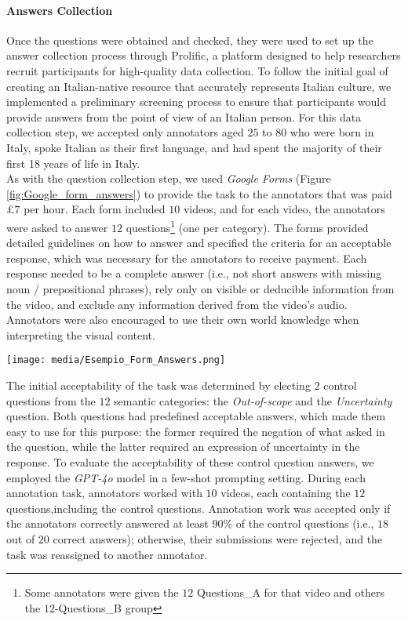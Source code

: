 \paragraph{Answers Collection}
Once the questions were obtained and checked, they were used to set up the answer collection process through Prolific, a platform designed to help researchers recruit participants for high-quality data collection. To follow the initial goal of creating an Italian-native resource that accurately represents Italian culture, we implemented a preliminary screening process to ensure that participants would provide answers from the point of view of an Italian person. For this data collection step, we accepted only annotators aged $25$ to $80$ who were born in Italy, spoke Italian as their first language, and had spent the majority of their first 18 years of life in Italy. \\
As with the question collection step, we used \textit{Google Forms} (Figure \ref{fig:Google_form_answers}) to provide the task to the annotators that was paid £$7$ per hour. Each form included $10$ videos, and for each video, the annotators were asked to answer $12$ questions\footnote{Some annotators were given the $12$ Questions\_A for that video and others the $12$-Questions\_B group} (one per category). The forms provided detailed guidelines on how to answer and specified the criteria for an acceptable response, which was necessary for the annotators to receive payment. Each response needed to be a complete answer (i.e., not short answers with missing noun / prepositional phrases), rely only on visible or deducible information from the video, and exclude any information derived from the video's audio. Annotators were also encouraged to use their own world knowledge when interpreting the visual content.
\begin{figure*}[h]
    \centering
  \texttt{[image: media/Esempio\_Form\_Answers.png]}
  \caption{Example of a Google Form used for collecting answers for each video}
  \label{fig:Google_form_answers}
\end{figure*}
The initial acceptability of the task was determined by electing $2$ control questions from the $12$ semantic categories: the \textit{Out-of-scope} and the \textit{Uncertainty} question. Both questions had predefined acceptable answers, which made them easy to use for this purpose: the former required the negation of what asked in the question, while the latter required an expression of uncertainty in the response. To evaluate the acceptability of these control question answers, we employed the \textit{GPT-4o} model in a few-shot prompting setting. During each annotation task, annotators worked with $10$ videos, each containing the $12$ questions,including the control questions. Annotation work was accepted only if the annotators correctly answered at least $90\%$ of the control questions (i.e., $18$ out of $20$ correct answers); otherwise, their submissions were rejected, and the task was reassigned to another annotator.\\
